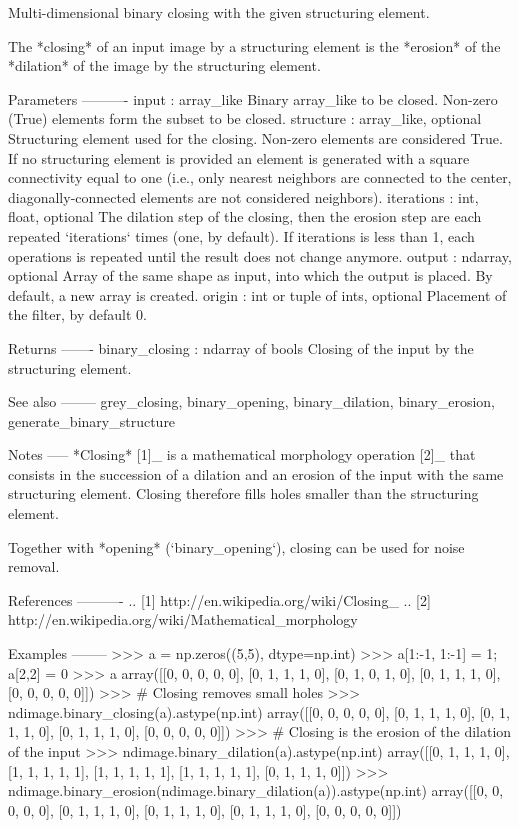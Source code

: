 \begin{DoxyVerb}Multi-dimensional binary closing with the given structuring element.

The *closing* of an input image by a structuring element is the
*erosion* of the *dilation* of the image by the structuring element.

Parameters
----------
input : array_like
    Binary array_like to be closed. Non-zero (True) elements form
    the subset to be closed.
structure : array_like, optional
    Structuring element used for the closing. Non-zero elements are
    considered True. If no structuring element is provided an element
    is generated with a square connectivity equal to one (i.e., only
    nearest neighbors are connected to the center, diagonally-connected
    elements are not considered neighbors).
iterations : {int, float}, optional
    The dilation step of the closing, then the erosion step are each
    repeated `iterations` times (one, by default). If iterations is
    less than 1, each operations is repeated until the result does
    not change anymore.
output : ndarray, optional
    Array of the same shape as input, into which the output is placed.
    By default, a new array is created.
origin : int or tuple of ints, optional
    Placement of the filter, by default 0.

Returns
-------
binary_closing : ndarray of bools
    Closing of the input by the structuring element.

See also
--------
grey_closing, binary_opening, binary_dilation, binary_erosion,
generate_binary_structure

Notes
-----
*Closing* [1]_ is a mathematical morphology operation [2]_ that
consists in the succession of a dilation and an erosion of the
input with the same structuring element. Closing therefore fills
holes smaller than the structuring element.

Together with *opening* (`binary_opening`), closing can be used for
noise removal.

References
----------
.. [1] http://en.wikipedia.org/wiki/Closing_%
.. [2] http://en.wikipedia.org/wiki/Mathematical_morphology

Examples
--------
>>> a = np.zeros((5,5), dtype=np.int)
>>> a[1:-1, 1:-1] = 1; a[2,2] = 0
>>> a
array([[0, 0, 0, 0, 0],
       [0, 1, 1, 1, 0],
       [0, 1, 0, 1, 0],
       [0, 1, 1, 1, 0],
       [0, 0, 0, 0, 0]])
>>> # Closing removes small holes
>>> ndimage.binary_closing(a).astype(np.int)
array([[0, 0, 0, 0, 0],
       [0, 1, 1, 1, 0],
       [0, 1, 1, 1, 0],
       [0, 1, 1, 1, 0],
       [0, 0, 0, 0, 0]])
>>> # Closing is the erosion of the dilation of the input
>>> ndimage.binary_dilation(a).astype(np.int)
array([[0, 1, 1, 1, 0],
       [1, 1, 1, 1, 1],
       [1, 1, 1, 1, 1],
       [1, 1, 1, 1, 1],
       [0, 1, 1, 1, 0]])
>>> ndimage.binary_erosion(ndimage.binary_dilation(a)).astype(np.int)
array([[0, 0, 0, 0, 0],
       [0, 1, 1, 1, 0],
       [0, 1, 1, 1, 0],
       [0, 1, 1, 1, 0],
       [0, 0, 0, 0, 0]])



\end{DoxyVerb}
